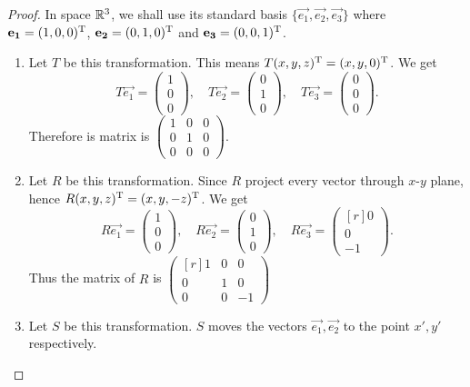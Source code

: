\begin{proof}
  In space $\mathbb{R}^3$, we shall use its standard basis 
  $\{\vec{e_1},\vec{e_2},\vec{e_3}\}$ where 
  $\mathbf{e_1}=(1,0,0)^\mathrm{T}$,
  $\mathbf{e_2}=(0,1,0)^\mathrm{T}$ and 
  $\mathbf{e_3}=(0,0,1)^\mathrm{T}$.
  \begin{enumerate}
    \item Let $T$ be this transformation. This means 
      $T(x,y,z)^\mathrm{T}=(x,y,0)^\mathrm{T}$. We get
      \[
        T\vec{e_1}= \begin{pmatrix} 1\\0\\0 \end{pmatrix},\quad
        T\vec{e_2}= \begin{pmatrix} 0\\1\\0 \end{pmatrix},\quad
        T\vec{e_3}= \begin{pmatrix} 0\\0\\0 \end{pmatrix}.
      \]
      Therefore is matrix is 
      $ \begin{pmatrix} 1&0&0\\0&1&0\\0&0&0 \end{pmatrix}. $
    \item Let $R$ be this transformation. Since $R$ project every vector
      through $x$-$y$ plane, hence $R(x,y,z)^\mathrm{T}=(x,y,-z)^\mathrm{T}$. We get
      \[
        R\vec{e_1}= \begin{pmatrix} 1\\0\\0 \end{pmatrix},\quad
        R\vec{e_2}= \begin{pmatrix} 0\\1\\0 \end{pmatrix},\quad
        R\vec{e_3}= \begin{pmatrix*}[r] 0\\0\\-1 \end{pmatrix*}.
      \]
      Thus the matrix of $R$ is 
      $
      \begin{pmatrix*}[r]
        1&0&0\\
        0&1&0\\
        0&0&-1
      \end{pmatrix*}
      $
    \item Let $S$ be this transformation. $S$ moves the vectors
      $\vec{e_1},\vec{e_2}$ to the point $x',y'$ respectively.
      \begin{center}
\end{center}
\end{enumerate}
\end{proof}

